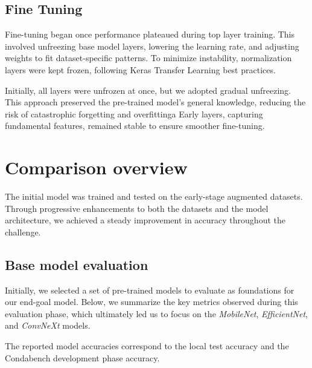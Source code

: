 \documentclass[11pt]{article}
\begin{document}
\begin{multicols}{2}
        \subsection{Fine Tuning}
        
        Fine-tuning began once performance plateaued during top layer training. This involved unfreezing base model layers, lowering the learning rate, and adjusting weights to fit dataset-specific patterns. To minimize instability, normalization layers were kept frozen, following Keras\cite{keras2015} Transfer Learning best practices.
        
        Initially, all layers were unfrozen at once, but we adopted gradual unfreezing. This approach preserved the pre-trained model’s general knowledge, reducing the risk of catastrophic forgetting and overfitting\cite{stackOverflowGradualUnfreezing2020}a Early layers, capturing fundamental features, remained stable to ensure smoother fine-tuning.

        
        \section{Comparison overview}
        
       The initial model was trained and tested on the early-stage augmented datasets. Through progressive enhancements to both the datasets and the model architecture, we achieved a steady improvement in accuracy throughout the challenge.
        
        \subsection{Base model evaluation}
        
        Initially, we selected a set of pre-trained models to evaluate as foundations for our end-goal model.
        Below, we summarize the key metrics observed during this evaluation phase, which ultimately led us to focus on the \textit{MobileNet}, \textit{EfficientNet}, and \textit{ConvNeXt} models.
        
        The reported model accuracies correspond to the local test accuracy and the Condabench development phase accuracy. 
        
\begin{table}[H]
    \centering
    \small
    \begin{tabular}{|c|c|c|}
        \hline


\end{tabular}
\end{table}
\end{multicols}
\end{document}
